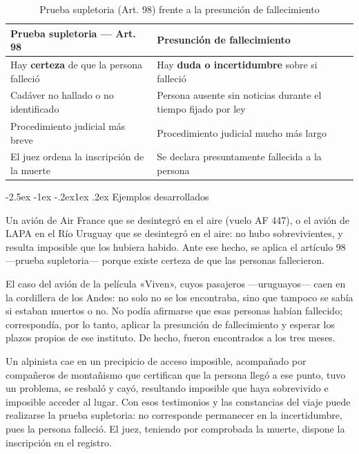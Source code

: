 \documentclass[12pt,oneside]{book}
\makeatletter
\renewcommand\subsection{\@startsection{subsection}{2}{\z@}%
  {-2.5ex \@plus -1ex \@minus -.2ex}{1ex \@plus .2ex}%
  {\normalfont\normalsize\bfseries}}
\makeatother
\begin{document}
\begin{table}[H]
\centering
\caption{Prueba supletoria (Art. 98) frente a la presunción de fallecimiento}
\begin{tabularx}{\textwidth}{X X}
\toprule
\textbf{Prueba supletoria --- Art. 98} & \textbf{Presunción de fallecimiento} \\
\midrule
Hay \textbf{certeza} de que la persona falleció & Hay \textbf{duda o incertidumbre} sobre si falleció \\
Cadáver no hallado o no identificado & Persona ausente sin noticias durante el tiempo fijado por ley \\
Procedimiento judicial más breve & Procedimiento judicial mucho más largo \\
El juez ordena la inscripción de la muerte & Se declara presuntamente fallecida a la persona \\
\bottomrule
\end{tabularx}
\end{table}

\subsection{Ejemplos desarrollados}

\begin{ejemplo}
Un avión de Air France que se desintegró en el aire (vuelo AF 447), o el avión de LAPA en el Río Uruguay que se desintegró en el aire: no hubo sobrevivientes, y resulta imposible que los hubiera habido. Ante ese hecho, se aplica el artículo 98 ---prueba supletoria--- porque existe certeza de que las personas fallecieron.
\end{ejemplo}

\begin{ejemplo}
El caso del avión de la película «Viven», cuyos pasajeros ---uruguayos--- caen en la cordillera de los Andes: no solo no se los encontraba, sino que tampoco se sabía si estaban muertos o no. No podía afirmarse que esas personas habían fallecido; correspondía, por lo tanto, aplicar la presunción de fallecimiento y esperar los plazos propios de ese instituto. De hecho, fueron encontrados a los tres meses.
\end{ejemplo}

\begin{ejemplo}
Un alpinista cae en un precipicio de acceso imposible, acompañado por compañeros de montañismo que certifican que la persona llegó a ese punto, tuvo un problema, se resbaló y cayó, resultando imposible que haya sobrevivido e imposible acceder al lugar. Con esos testimonios y las constancias del viaje puede realizarse la prueba supletoria: no corresponde permanecer en la incertidumbre, pues la persona falleció. El juez, teniendo por comprobada la muerte, dispone la inscripción en el registro.
\end{ejemplo}
\end{document}
